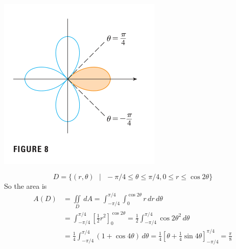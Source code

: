 \documentclass{article}
\begin{document}
\begin{minipage}[]{0.3\linewidth}
  \includegraphics[width=4.3 cm]{images/2022-04-03-18-29-01.png}
\end{minipage}
\begin{minipage}[]{0.67\linewidth}
  \[D = \{(r, \theta) \text{ }  | \text{ } -\pi/4 \le \theta \le \pi/4, 0 \le r \le \cos{2\theta }\}\]
  So the area is 
    \begin{equation*}
      \begin{split}
        A(D) & = \iint \limits_{D }\, dA = \int_{- \pi / 4 }^{\pi / 4   } \int_0^{\cos{2\theta}} r \,dr\,d\theta \\ 
             & =\int_{- \pi / 4 }^{\pi / 4   }  \left[ \frac{1}{2}r^2  \right]_0^{\cos{2\theta}} = \frac{1}{2}\int_{- \pi / 4 }^{\pi / 4   }  \cos{2\theta}^2 \, d\theta \\ 
             & = \frac{1}{4} \int_{- \pi / 4 }^{\pi / 4   } ( 1 + \cos{4 \theta }) \, d\theta = \frac{1}{4}  \left[ \theta + \frac{1}{4} \sin{4 \theta } \right]_{- \pi /4 }^{\pi / 4    } = \frac{\pi }{ 8 }
      \end{split}
    \end{equation*}
    
  \end{minipage}
  
\end{document}
